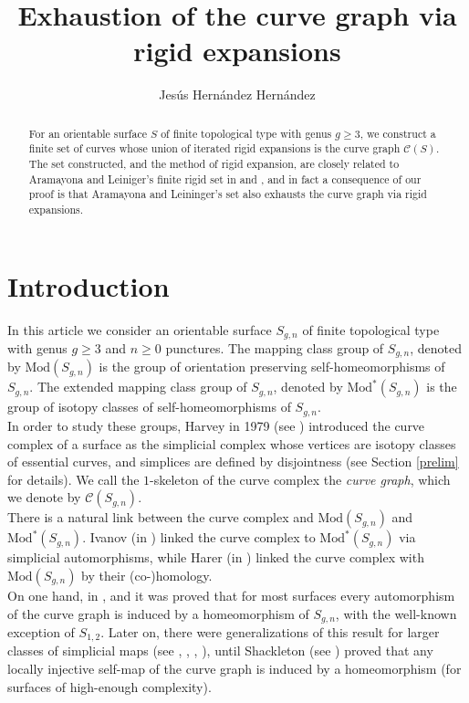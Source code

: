 \documentclass[twoside,11pt,a4paper]{article}
\author{Jes\'{u}s Hern\'{a}ndez Hern\'{a}ndez}
\title{Exhaustion of the curve graph via rigid expansions}
\date{}
\newcommand*{\ccomp}[1]{\mathcal{C}(#1)}
\newcommand*{\Mod}[1]{\mathrm{Mod}(#1)}
\newcommand*{\EMod}[1]{\mathrm{Mod}^{*}(#1)}
\begin{document}
\maketitle
\begin{abstract}
 For an orientable surface $S$ of finite topological type with genus $g \geq 3$, we construct a finite set of curves whose union of iterated rigid expansions is the curve graph $\ccomp{S}$. The set constructed, and the method of rigid expansion, are closely related to Aramayona and Leiniger's finite rigid set in \cite{Ara1} and \cite{Ara2}, and in fact a consequence of our proof is that Aramayona and Leininger's set also exhausts the curve graph via rigid expansions.
\end{abstract}
\section*{Introduction}
\indent In this article we consider an orientable surface $S_{g,n}$ of finite topological type with genus $g \geq 3$ and $n \geq 0$ punctures. The mapping class group of $S_{g,n}$, denoted by $\Mod{S_{g,n}}$ is the group of orientation preserving self-homeomorphisms of $S_{g,n}$. The extended mapping class group of $S_{g,n}$, denoted by $\EMod{S_{g,n}}$ is the group of isotopy classes of self-homeomorphisms of $S_{g,n}$.\\
\indent In order to study these groups, Harvey in 1979 (see \cite{Harvey}) introduced the curve complex of a surface as the simplicial complex whose vertices are isotopy classes of essential curves, and simplices are defined by disjointness (see Section \ref{prelim} for details). We call the $1$-skeleton of the curve complex the \textit{curve graph}, which we denote by $\ccomp{S_{g,n}}$.\\
\indent There is a natural link between the curve complex and $\Mod{S_{g,n}}$ and $\EMod{S_{g,n}}$. Ivanov (in \cite{Ivanov}) linked the curve complex to $\EMod{S_{g,n}}$ via simplicial automorphisms, while Harer (in \cite{Harer}) linked the curve complex with $\Mod{S_{g,n}}$ by their (co-)homology.\\
\indent On one hand, in \cite{Ivanov}, \cite{Korkmaz} and \cite{Luo} it was proved that for most surfaces every automorphism of the curve graph is induced by a homeomorphism of $S_{g,n}$, with the well-known exception of $S_{1,2}$. Later on, there were generalizations of this result for larger classes of simplicial maps (see \cite{Irmak1}, \cite{Irmak2}, \cite{Irmak3}, \cite{BehrMar}), until Shackleton (see \cite{Shack}) proved that any locally injective self-map of the curve graph is induced by a homeomorphism (for surfaces of high-enough complexity).\\
\end{document}
